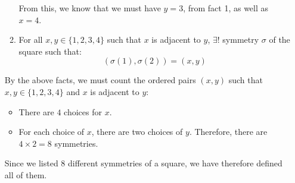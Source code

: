 \begin{itemize}
\begin{enumerate}
\begin{center}
        \end{center}
        From this, we know that we  must have $y=3$, from fact 1, as well as $x=4$.
        \item For all $x,y\in\{1,2,3,4\}$ such that $x$ is adjacent to $y$, $\exists!$ symmetry $\sigma$ of the square such that:
        \begin{equation}
            (\sigma(1), \sigma(2)) = (x,y)
        \end{equation}
    \end{enumerate}
    By the above facts, we must count the ordered pairs $(x,y)$ such that $x,y \in \{1,2,3,4\}$ and $x$ is adjacent to $y$:
    \begin{itemize}
        \item There are $4$ choices for $x$.
        \item For each choice of $x$, there are two choices of $y$. Therefore, there are $4\times 2 = 8$ symmetries.
    \end{itemize}
    Since we listed $8$ different symmetries of a square, we have therefore defined all of them.
\end{itemize}
